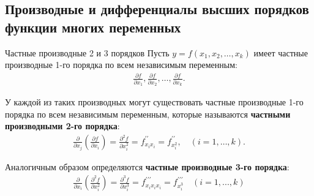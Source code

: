 \subsection{Производные и дифференциалы высших порядков функции многих переменных} \label{sec:2.5}



\begin{tbox}{Частные производные 2 и 3 порядков}
	Пусть $y = f(x_1, x_2, \dots, x_k)$ имеет частные производные 1-го порядка по всем независимым переменным:
	\begin{align} \label{eq:2.5.1}
		\frac{\partial f}{\partial x_1}, \frac{\partial f}{\partial x_2}, \dots, \frac{\partial f}{\partial x_k}.
	\end{align}

	У каждой из таких производных могут существовать частные производные 1-го порядка по всем независимым переменным, которые называются \textbf{частными производными 2-го порядка}:
	\begin{align} \label{eq:2.5.2}
		\frac{\partial}{\partial x_j} \left( \frac{\partial f}{\partial x_i} \right) = \frac{\partial^2 f}{\partial x_i^2} = f^{\prime\prime}_{x_i x_i} = f^{\prime\prime}_{x_i^2}, \quad (i = 1, \dots, k).
	\end{align}

	Аналогичным образом определяются \textbf{частные производные 3-го порядка}:
	\begin{align}\label{eq:2.5.3}
		\frac{\partial}{\partial x_i} \left( \frac{\partial^2 f}{\partial x_i^2} \right) = \frac{\partial^3 f}{\partial x_i^3} = f^{\prime\prime\prime}_{x_i x_i x_i} = f^{\prime\prime\prime}_{x_i^3} \quad (i = 1,...,k)
	\end{align}
\end{tbox}

